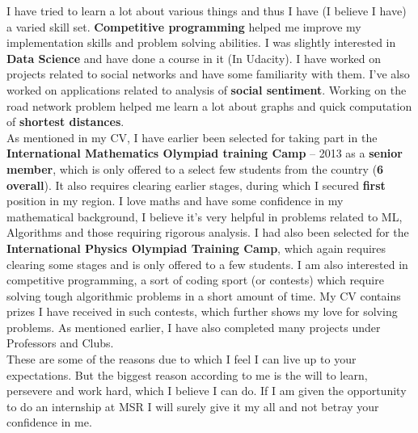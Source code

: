 \documentclass[a4paper]{article}
\begin{document}
I have tried to learn a lot about various things and thus I have (I believe I have) a varied skill set. \textbf{Competitive programming} helped me improve my implementation skills and problem solving abilities. I was slightly interested in \textbf{Data Science} and have done a course in it (In Udacity). I have worked on projects related to social networks and have some familiarity with them. I've also worked on applications related to analysis of \textbf{social sentiment}. Working on the road network problem helped me learn a lot about graphs and quick computation of \textbf{shortest distances}.\\

As mentioned in my CV, I have earlier been selected for taking part in the \textbf{International Mathematics Olympiad training Camp} – 2013 as a \textbf{senior member}, which is only offered to a select few students from the country (\textbf{6 overall}). It also requires clearing earlier stages, during which I secured \textbf{first} position in my region. I love maths and have some confidence in my  mathematical background, I believe it's very helpful in problems related to ML, Algorithms and those requiring rigorous analysis. I had also been selected for the \textbf{International Physics Olympiad Training Camp}, which again requires clearing some stages and is only offered to a few students. I am also interested in competitive programming, a sort of coding sport (or contests) which require solving tough algorithmic problems in a short amount of time. My CV contains prizes I have received in such contests, which further shows my love for solving problems. As mentioned earlier, I have also completed many projects under Professors and Clubs. \\

These are some of the reasons due to which I feel I can live up to your expectations. But the biggest reason according to me is the will to learn, persevere and work hard, which I believe I can do. If I am given the opportunity to do an internship at MSR I will surely give it my all and not betray your confidence in me. \\
\end{document}
